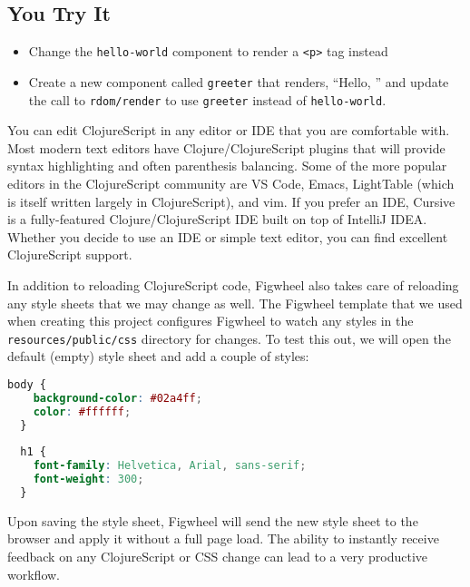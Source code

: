 \documentclass[10pt,twoside,openright]{memoir}
\begin{document}
\subsection{You Try It}

\begin{itemize}
\tightlist
\item
  Change the \texttt{hello-world} component to render a
  \texttt{\textless{}p\textgreater{}} tag instead
\item
  Create a new component called \texttt{greeter} that renders, ``Hello,
  '' and update the call to \texttt{rdom/render} to use \texttt{greeter}
  instead of \texttt{hello-world}.
\end{itemize}

\begin{notice}[title={Do I need an IDE?}]
You can edit ClojureScript in any editor or IDE that you are comfortable
with. Most modern text editors have Clojure/ClojureScript plugins that
will provide syntax highlighting and often parenthesis balancing. Some
of the more popular editors in the ClojureScript community are VS Code,
Emacs, LightTable (which is itself written largely in ClojureScript),
and vim. If you prefer an IDE, Cursive is a fully-featured
Clojure/ClojureScript IDE built on top of IntelliJ IDEA. Whether you
decide to use an IDE or simple text editor, you can find excellent
ClojureScript support.
\end{notice}

In addition to reloading ClojureScript code, Figwheel also takes care of
reloading any style sheets that we may change as well. The Figwheel
template that we used when creating this project configures Figwheel to
watch any styles in the \texttt{resources/public/css} directory for
changes. To test this out, we will open the default (empty) style sheet
and add a couple of styles:

\begin{lstlisting}[language=CSS, caption={resources/public/css/style.css}]
  body {
    background-color: #02a4ff;
    color: #ffffff;
  }
  
  h1 {
    font-family: Helvetica, Arial, sans-serif;
    font-weight: 300;
  }
\end{lstlisting}

Upon saving the style sheet, Figwheel will send the new style sheet to the
browser and apply it without a full page load. The ability to instantly
receive feedback on any ClojureScript or CSS change can lead to a very
productive workflow.
\end{document}
